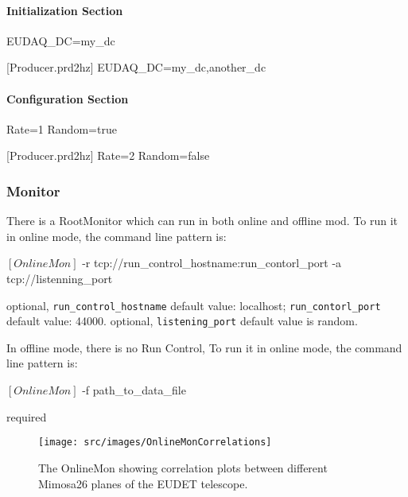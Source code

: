 \paragraph{Initialization Section}
\begin{listing}
EUDAQ_DC=my_dc

[Producer.prd2hz]
EUDAQ_DC=my_dc,another_dc
\end{listing}

\paragraph{Configuration Section}
\begin{listing}
Rate=1
Random=true

[Producer.prd2hz]
Rate=2
Random=false
\end{listing}


\subsubsection{Monitor}
\label{sec:onlinemonitor}
There is a RootMonitor which can run in both online and offline mod.
To run it in online mode, the command line pattern is:
\begin{listing}[mybash]
$[OnlineMon]$ -r tcp://{run_control_hostname}:{run_contorl_port} -a tcp://{listenning_port}
\end{listing}

\begin{description}
optional, \texttt{run\_control\_hostname} default value: localhost;  \texttt{run\_contorl\_port}  default value: 44000.
optional, \texttt{listening\_port} default value is random.
\end{description}

In offline mode, there is no Run Control, To run it in online mode, the command line pattern is:
\begin{listing}[mybash]
$[OnlineMon]$ -f {path_to_data_file}
\end{listing}

\begin{description}
required
\end{description}

\begin{figure}[htb]
  \begin{center}
    \texttt{[image: src/images/OnlineMonCorrelations]}
    \caption{The OnlineMon showing correlation plots between different
      Mimosa26 planes of the EUDET telescope.}
    \label{fig:OnlineMonPlots}
  \end{center}
\end{figure}

